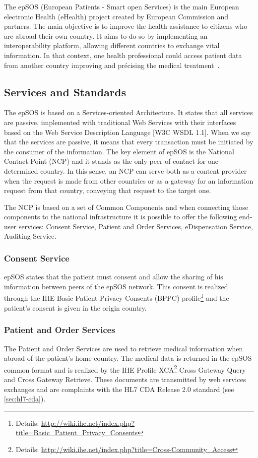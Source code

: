 The epSOS (European Patients - Smart open Services) is the main European electronic Health (eHealth) project created by European Commission and partners. The main objective is to improve the health assistance to citizens who are abroad their own country. It aims to do so by implementing an interoperability platform, allowing different countries to exchange vital information. In that context, one health professional could access patient data from another country improving and précising the medical treatment~\citep{EpSOS}.

\subsection{Services and Standards}

The epSOS is based on a Services-oriented Architecture. It states that all services are passive, implemented with traditional Web Services with their interfaces based on the Web Service Description Language [W3C WSDL 1.1]. When we say that the services are passive, it means that every transaction must be initiated by the consumer of the information.
The key element of epSOS is the National Contact Point (NCP) and it stands as the only peer of contact for one determined country. In this sense, an NCP can serve both as a content provider when the request is made from other countries or as a gateway for an information request from that country, conveying that request to the target one.

The NCP is based on a set of Common Components and when connecting those components to the national infrastructure it is possible to offer the following end-user services: Consent Service, Patient and Order Services, eDispensation Service, Auditing Service.

\subsubsection{Consent Service}
epSOS states that the patient must consent and allow the sharing of his information between peers of the epSOS network. This consent is realized through the IHE Basic Patient Privacy Consents (BPPC) profile\footnote{Details: \url{http://wiki.ihe.net/index.php?title=Basic_Patient_Privacy_Consents}} and the patient's consent is given in the origin country.

\subsubsection{Patient and Order Services}
The Patient and Order Services are used to retrieve medical information when abroad of the patient's home country. The medical data is returned in the epSOS common format and is realized by the IHE Profile XCA\footnote{Details: \url{http://wiki.ihe.net/index.php?title=Cross-Community_Access}} Cross Gateway Query and Cross Gateway Retrieve. These documents are transmitted by web services exchanges and are complaints with the HL7 CDA Release 2.0 standard (see \ref{sec:hl7-cda}).

